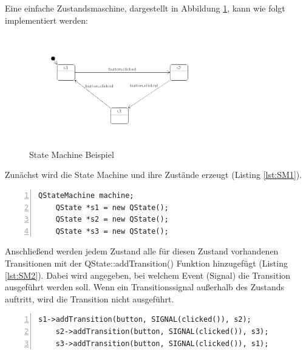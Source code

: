 Eine einfache Zustandsmaschine, dargestellt in Abbildung \ref{fig:StateMachineexample}, kann wie folgt implementiert werden:

\begin{figure}[htb]
    \centering
    \includegraphics[width=0.7\textwidth]{Abbildungen/statemachinebutton.png}
    \caption[State Machine Beispiel \newline Quelle: \textit{https://doc.qt.io/qt-5/statemachine-api.html}]{State Machine Beispiel}		
    \label{fig:StateMachineexample}
\end{figure}

Zunächst wird die State Machine und ihre Zustände erzeugt (Listing \ref{lst:SM1}). 

\begin{lstlisting}[frame=single, breaklines=true, numbers=left, stepnumber=2, firstnumber=1, numberstyle = \tiny, caption=State Machine Beispiel Teil 1 ,label=lst:SM1]
    QStateMachine machine;
    QState *s1 = new QState();
    QState *s2 = new QState();
    QState *s3 = new QState();
\end{lstlisting}

Anschließend werden jedem Zustand alle für diesen Zustand vorhandenen Transitionen mit der QState::addTransition() Funktion hinzugefügt (Listing \ref{lst:SM2}). Dabei wird angegeben, bei welchem Event (Signal) die Transition ausgeführt werden soll. Wenn ein Transitionssignal außerhalb des Zustands auftritt, wird die Transition nicht ausgeführt. 

\begin{lstlisting}[frame=single, breaklines=true, numbers=left, stepnumber=2, firstnumber=1, numberstyle = \tiny, caption=State Machine Beispiel Teil 2 ,label=lst:SM2]
    s1->addTransition(button, SIGNAL(clicked()), s2);
    s2->addTransition(button, SIGNAL(clicked()), s3);
    s3->addTransition(button, SIGNAL(clicked()), s1);
\end{lstlisting}

